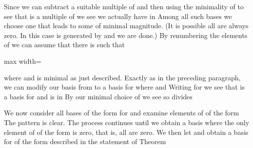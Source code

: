 \documentclass[11pt,oneside]{article}
\begin{document}
\BookNarrativetrue

\begin{BookBody}

\noindent Since  we can subtract a suitable multiple of  and then using the minimality of  to see that  is a multiple of  we see we actually have  in  Among all such bases  we choose one  that leads to some  of minimal magnitude. (It is possible all  are always zero. In this case is generated by  and we are done.) By renumbering the elements of  we can assume that there is  such that

\begin{center}\begin{adjustbox}{max width=\linewidth}\end{adjustbox}\end{center}

\noindent where  and  is minimal as just described. Exactly as in the preceding paragraph, we can modify our basis from  to a basis  for  where  and  Writing  for  we see that   is a basis for  and  is in  By our minimal choice of  we see  so  divides 

We now consider all bases of the form  for  and examine elements of  of the form  The pattern is clear. The process continues until we obtain a basis  where the only element of  of the form  is zero, that is, all  are zero. We then let   and obtain a basis for  of the form described in the statement of Theorem \BookEnd{\blacklozenge}


\end{BookBody}
\end{document}
